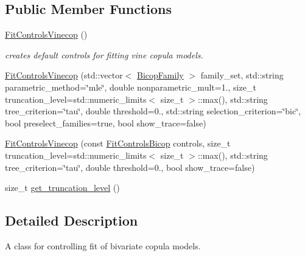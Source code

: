 \subsection*{Public Member Functions}
\begin{DoxyCompactItemize}
\item 
\hyperlink{classvinecopulib_1_1_fit_controls_vinecop_ad101d135c8d8fe66046d931947f45bef}{Fit\+Controls\+Vinecop} ()\hypertarget{classvinecopulib_1_1_fit_controls_vinecop_ad101d135c8d8fe66046d931947f45bef}{}\label{classvinecopulib_1_1_fit_controls_vinecop_ad101d135c8d8fe66046d931947f45bef}

\begin{DoxyCompactList}\small\item\em creates default controls for fitting vine copula models. \end{DoxyCompactList}\item 
\hyperlink{classvinecopulib_1_1_fit_controls_vinecop_a0e908bcfa9eb6768d19dd711a6d11ad3}{Fit\+Controls\+Vinecop} (std\+::vector$<$ \hyperlink{namespacevinecopulib_a42e95cc06d33896199caab0c11ad44f3}{Bicop\+Family} $>$ family\+\_\+set, std\+::string parametric\+\_\+method=\char`\"{}mle\char`\"{}, double nonparametric\+\_\+mult=1., size\+\_\+t truncation\+\_\+level=std\+::numeric\+\_\+limits$<$ size\+\_\+t $>$\+::max(), std\+::string tree\+\_\+criterion=\char`\"{}tau\char`\"{}, double threshold=0., std\+::string selection\+\_\+criterion=\char`\"{}bic\char`\"{}, bool preselect\+\_\+families=true, bool show\+\_\+trace=false)
\item 
\hyperlink{classvinecopulib_1_1_fit_controls_vinecop_ac755f0c41c3322cdd773a7a75ae98e7c}{Fit\+Controls\+Vinecop} (const \hyperlink{classvinecopulib_1_1_fit_controls_bicop}{Fit\+Controls\+Bicop} controls, size\+\_\+t truncation\+\_\+level=std\+::numeric\+\_\+limits$<$ size\+\_\+t $>$\+::max(), std\+::string tree\+\_\+criterion=\char`\"{}tau\char`\"{}, double threshold=0., bool show\+\_\+trace=false)
\end{DoxyCompactItemize}
{\bf }\par
\begin{DoxyCompactItemize}
\item 
size\+\_\+t \hyperlink{classvinecopulib_1_1_fit_controls_vinecop_afa52dd1f64f6a89ba59ad80374c268a0}{get\+\_\+truncation\+\_\+level} ()
\end{DoxyCompactItemize}



\subsection{Detailed Description}
A class for controlling fit of bivariate copula models. 

